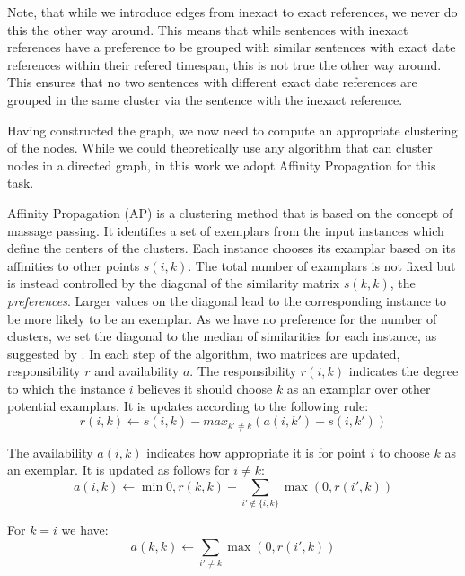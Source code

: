 \documentclass[a4paper,BCOR=10mm]{report}
\begin{document}
Note, that while we introduce edges from inexact to exact references, we never do this the other way around. This means that while sentences with inexact references have a preference to be grouped with similar sentences with exact date references within their refered timespan, this is not true the other way around.
This ensures that no two sentences with different exact date references are grouped in the same cluster via the sentence with the inexact reference.

Having constructed the graph, we now need to compute an appropriate clustering of the nodes. While we could theoretically use any algorithm that can cluster nodes in a directed graph, in this work we adopt Affinity Propagation for this task.

Affinity Propagation (AP) \citep{ap} is a clustering method that is based on the concept of massage passing. It identifies a set of exemplars from the input instances which define the centers of the clusters. Each instance chooses its examplar based on its affinities to other points $s(i, k)$.
The total number of examplars is not fixed but is instead controlled by the diagonal of the similarity matrix $s(k, k)$, the \textit{preferences}. Larger values on the diagonal lead to the corresponding instance to be more likely to be an exemplar.
As we have no preference for the number of clusters, we set the diagonal to the median of similarities for each instance, as suggested by \citeauthor{ap}.
In each step of the algorithm, two matrices are updated, responsibility $r$ and availability $a$. The responsibility $r(i, k)$ indicates the degree to which the instance $i$ believes it should choose $k$ as an examplar over other potential examplars. It is updates according to the following rule:
\begin{displaymath}
r(i, k) \leftarrow s(i, k) - max_{k' \neq k}( a(i, k') + s(i, k') )
\end{displaymath}

The availability $a(i, k)$ indicates how appropriate it is for point $i$ to choose $k$ as an exemplar.
It is updated as follows for $i \neq k$:
\begin{displaymath}
a(i, k) \leftarrow \min 0, r(k, k) + \sum_{i' \not\in \{i, k\}} \max(0, r(i', k))
\end{displaymath}

For $k = i$ we have:
\begin{displaymath}
a(k, k) \leftarrow \sum_{i' \neq k} \max(0, r(i', k))
\end{displaymath}
\end{document}
